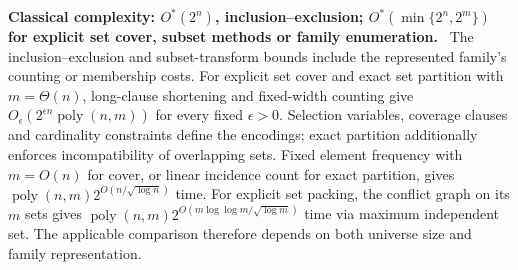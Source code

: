 \documentclass[11pt,a4paper]{article}
\theoremstyle{problemstyle}
\newcommand{\complexity}[2]{\par\noindent\textbf{\boldmath #1 complexity: #2}\ }
\begin{document}
\complexity{Classical}{$O^*(2^n)$, inclusion--exclusion; $O^*(\min\{2^n,2^m\})$ for explicit set cover, subset methods or family enumeration.}
The inclusion--exclusion and subset-transform bounds include the represented family's counting or membership costs. For explicit set cover and exact set partition with $m=\Theta(n)$, long-clause shortening and fixed-width counting give $O_\epsilon(2^{\epsilon n}\operatorname{poly}(n,m))$ for every fixed $\epsilon>0$. Selection variables, coverage clauses and cardinality constraints define the encodings; exact partition additionally enforces incompatibility of overlapping sets. Fixed element frequency with $m=O(n)$ for cover, or linear incidence count for exact partition, gives $\operatorname{poly}(n,m)2^{O(n/\sqrt{\log n})}$ time. For explicit set packing, the conflict graph on its $m$ sets gives $\operatorname{poly}(n,m)2^{O(m\log\log m/\sqrt{\log m})}$ time via maximum independent set. The applicable comparison therefore depends on both universe size and family representation.
\end{document}
